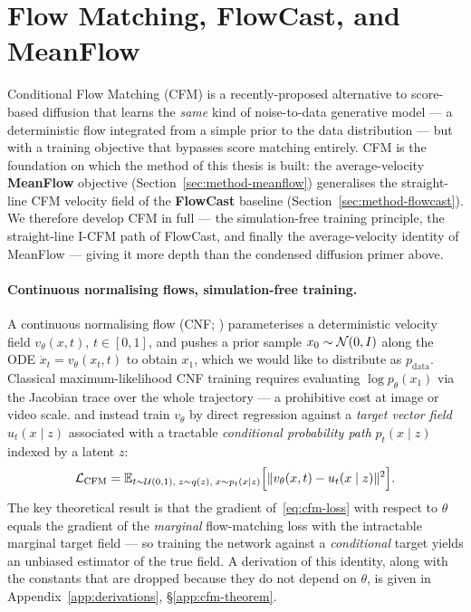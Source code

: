 \section{Flow Matching, FlowCast, and MeanFlow}
\label{sec:bg-flowmatching}

Conditional Flow Matching (CFM) is a recently-proposed alternative to score-based diffusion that learns the \emph{same} kind of noise-to-data generative model --- a deterministic flow integrated from a simple prior to the data distribution --- but with a training objective that bypasses score matching entirely. CFM is the foundation on which the method of this thesis is built: the average-velocity \textbf{MeanFlow} objective (Section~\ref{sec:method-meanflow}) generalises the straight-line CFM velocity field of the \textbf{FlowCast} baseline (Section~\ref{sec:method-flowcast}). We therefore develop CFM in full --- the simulation-free training principle, the straight-line I-CFM path of FlowCast, and finally the average-velocity identity of MeanFlow --- giving it more depth than the condensed diffusion primer above.

\paragraph{Continuous normalising flows, simulation-free training.} A continuous normalising flow (CNF; \citealp{chen2018node}) parameterises a deterministic velocity field $v_\theta(x, t)$, $t \in [0, 1]$, and pushes a prior sample $x_0 \sim \mathcal{N}(0, I)$ along the ODE $\dot{x}_t = v_\theta(x_t, t)$ to obtain $x_1$, which we would like to distribute as $p_{\text{data}}$. Classical maximum-likelihood CNF training requires evaluating $\log p_\theta(x_1)$ via the Jacobian trace over the whole trajectory --- a prohibitive cost at image or video scale. \citet{lipman2023flow} and \citet{tong2024improving} instead train $v_\theta$ by direct regression against a \emph{target vector field} $u_t(x \mid z)$ associated with a tractable \emph{conditional probability path} $p_t(x \mid z)$ indexed by a latent $z$:
\begin{equation}
  \mathcal{L}_{\text{CFM}} = \mathbb{E}_{t \sim \mathcal{U}(0, 1),\; z \sim q(z),\; x \sim p_t(x \mid z)}\Bigl[\|v_\theta(x, t) - u_t(x \mid z)\|^2\Bigr].
  \label{eq:cfm-loss}
\end{equation}
The key theoretical result \citep[Thm.~2]{lipman2023flow} is that the gradient of~\eqref{eq:cfm-loss} with respect to $\theta$ equals the gradient of the \emph{marginal} flow-matching loss with the intractable marginal target field --- so training the network against a \emph{conditional} target yields an unbiased estimator of the true field. A derivation of this identity, along with the constants that are dropped because they do not depend on $\theta$, is given in Appendix~\ref{app:derivations}, \S\ref{app:cfm-theorem}.

